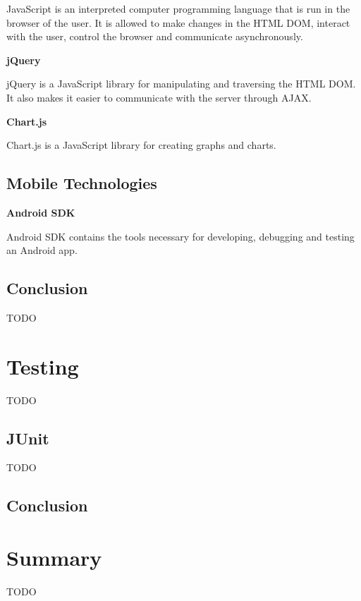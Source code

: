 JavaScript is an interpreted computer programming language that is run in the browser of the user.
It is allowed to make changes in the HTML DOM, interact with the user, control the browser and communicate asynchronously.

\textbf{jQuery}

jQuery is a JavaScript library for manipulating and traversing the HTML DOM.
It also makes it easier to communicate with the server through AJAX.

\textbf{Chart.js}

Chart.js is a JavaScript library for creating graphs and charts.

\subsection{Mobile Technologies}

\textbf{Android SDK}

Android SDK contains the tools necessary for developing, debugging and testing an Android app.

\subsection{Conclusion}

TODO

\section{Testing}

TODO

\subsection{JUnit}

TODO

\subsection{Conclusion}


\section{Summary}

TODO
